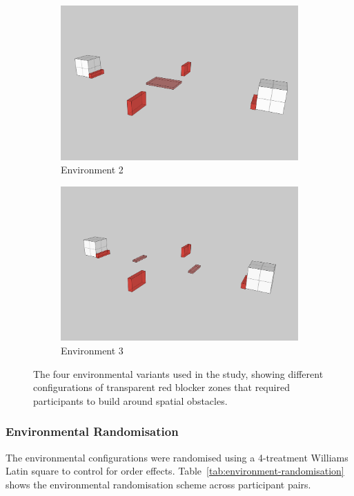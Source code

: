 \begin{figure}[htbp]
    \begin{subfigure}[b]{0.48\textwidth}
        \centering
        \includegraphics[width=\textwidth]{assets/05/environment-2.png}
        \caption{Environment 2}
        \label{fig:env-2}
    \end{subfigure}
    \hfill
    \begin{subfigure}[b]{0.48\textwidth}
        \centering
        \includegraphics[width=\textwidth]{assets/05/environment-3.png}
        \caption{Environment 3}
        \label{fig:env-3}
    \end{subfigure}
    \caption{The four environmental variants used in the study, showing different configurations of transparent red blocker zones that required participants to build around spatial obstacles.}
    \label{fig:environment-variants}
\end{figure}

\subsubsection{Environmental Randomisation}
The environmental configurations were randomised using a 4-treatment Williams Latin square to control for order effects\cite{williams1949experimental}. Table~\ref{tab:environment-randomisation} shows the environmental randomisation scheme across participant pairs.

